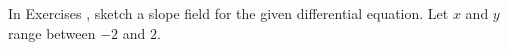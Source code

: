 {\noindent In Exercises}
{, sketch a slope field for the given differential equation. Let $x$ and $y$ range between $-2$ and $2$.}
